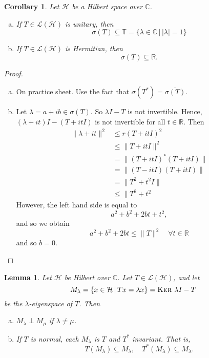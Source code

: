 \documentclass[10pt, oneside, reqno]{amsbook}
\theoremstyle{plain}%
\newtheorem{lem}[thm]{Lemma}
\newtheorem*{cor}{Corollary}
\theoremstyle{definition}
\theoremstyle{remark}
\newcommand{\given}{ \, | \,}
\newcommand{\R}{\mathbb{R}}
\newcommand{\Com}{\mathbb{C}}
\renewcommand{\ker}{\textsc{Ker\ }}
\begin{document}
\begin{cor}
    Let $\mathcal H$ be a Hilbert space over $\Com$.  \begin{enumerate}[(a)]
        \item If $T \in \mathcal L(\mathcal H)$ is unitary, then \[
            \sigma(T) \subseteq \mathbb{T} = \{ \lambda \in \Com \given | \lambda | = 1 \}\]
        \item If $T \in \mathcal L(\mathcal H)$ is Hermitian, then \[
            \sigma(T) \subseteq \R.
        \]
    \end{enumerate}
\end{cor}
\begin{proof}{\ }\begin{enumerate}[(a)]
    \item On practice sheet.  Use the fact that $\sigma(T^*) = \overline{\sigma(T)}$.
    \item Let $\lambda = a + ib \in \sigma(T)$.  So $\lambda I - T$ is not invertible.  Hence, $(\lambda + it)I - (T + it I)$ is not invertible for all $t \in \R$. 
  Then \begin{align*}
        \| \lambda + it \|^2    &\leq r(T + itI)^2 \\
                                &\leq \| T + itI \|^2 \\
                                &= \| (T + itI)^* ( T + itI) \| \\
                                &= \| (T - itI)(T + itI) \| \\
                                &= \| T^2 + t^2 I \| \\
                                &\leq \| T^2 + t^2
    \end{align*}  However, the left hand side is equal to \[
        a^2 + b^2 + 2bt + t^2,
    \] and so we obtain \[
        a^2 + b^2 + 2bt \leq \| T \|^2 \quad \forall t \in \R
    \] and so $b = 0$.  
\end{enumerate}
\end{proof}

\begin{lem}
    Let $\mathcal H$ be Hilbert over $\Com$.  Let $T \in \mathcal L(\mathcal H)$, and let \[
        M_\lambda = \{ x \in \mathcal H \given Tx = \lambda x \} = \ker \lambda I - T
    \]  be the $\lambda$-eigenspace of $T$.  Then \begin{enumerate}[(a)]
        \item $M_\lambda \perp M_\mu$ if $\lambda \neq \mu$.  
        \item If $T$ is normal, each $M_\lambda$ is $T$ and $T^*$ invariant.  That is, \[
            T(M_\lambda) \subseteq M_\lambda, \quad T^*(M_\lambda) \subseteq M_\lambda.
        \]
    \end{enumerate}
\end{lem}
\end{document}
